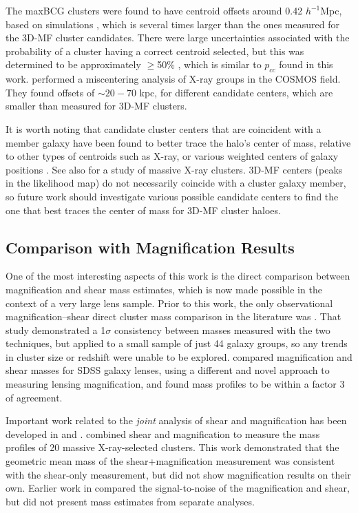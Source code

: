 The maxBCG clusters were found to have centroid offsets around 0.42 $h^{-1}$Mpc, based on simulations \citep{Johnston07}, which is several times larger than the ones measured for the \ac{3D-MF} cluster candidates. There were large uncertainties associated with the probability of a cluster having a correct centroid selected, but this was determined to be approximately $\ge$50\% \citep[see Figure 5 in][]{Johnston07}, which is similar to $p_{cc}$ found in this work. \citet{George12} performed a miscentering analysis of X-ray groups in the \ac{COSMOS} field. They found offsets of $\sim 20-70$ kpc, for different candidate centers, which are smaller than measured for \ac{3D-MF} clusters. 

It is worth noting that candidate cluster centers that are coincident with a member galaxy have been found to better trace the halo's center of mass, relative to other types of centroids such as X-ray, or various weighted centers of galaxy positions \citep{George12}. See also \citet{Bildfell08} for a study of massive X-ray clusters. \ac{3D-MF} centers (peaks in the likelihood map) do not necessarily coincide with a cluster galaxy member, so future work should investigate various possible candidate centers to find the one that best traces the center of mass for \ac{3D-MF} cluster haloes.


\subsection{Comparison with Magnification Results}
\label{sec:magn4}

One of the most interesting aspects of this work is the direct comparison between magnification and shear mass estimates, which is now made possible in the context of a very large lens sample. Prior to this work, the only observational magnification--shear direct cluster mass comparison in the literature was \citet{Ford12}. That study demonstrated a 1$\sigma$ consistency between masses measured with the two techniques, but applied to a small sample of just 44 galaxy groups, so any trends in cluster size or redshift were unable to be explored. \citet{Huff14} compared magnification and shear masses for \ac{SDSS} galaxy lenses, using a different and novel approach to measuring lensing magnification, and found mass profiles to be within a factor 3 of agreement.

Important work related to the {\it joint} analysis of shear and magnification has been developed in \citet{Umetsu11} and \citet{Umetsu13}. \citet{Umetsu14} combined shear and magnification to measure the mass profiles of 20 massive X-ray-selected clusters. This work demonstrated that the geometric mean mass of the shear+magnification measurement was consistent with the shear-only measurement, but did not show magnification results on their own. Earlier work in \citet{Umetsu11} compared the signal-to-noise of the magnification and shear, but did not present mass estimates from separate analyses. 

